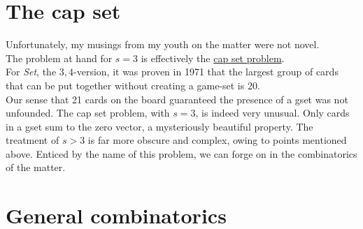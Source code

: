 \documentclass{article}
\theoremstyle{definition}
\theoremstyle{remark}
\begin{document}
\section{The cap set}

Unfortunately, my musings from my youth on the matter were not novel.\\
The problem at hand for $s=3$ is effectively the \href{https://en.wikipedia.org/wiki/Cap_set}{cap set problem}.\\
For \emph{Set}, the $3,4$-version, it was proven in 1971 that the largest group of cards that can be put together without creating a game-set is 20.\\
Our sense that 21 cards on the board guaranteed the presence of a gset was not unfounded.
\medbreak
The cap set problem, with $s=3$, is indeed very unusual. Only cards in a gset sum to the zero vector, a mysteriously beautiful property.
The treatment of $s>3$ is far more obscure and complex, owing to points mentioned above.
\bigbreak
Enticed by the name of this problem, we can forge on in the combinatorics of the matter.

\section{General combinatorics}
\label{sec:gen_comb}
\end{document}
